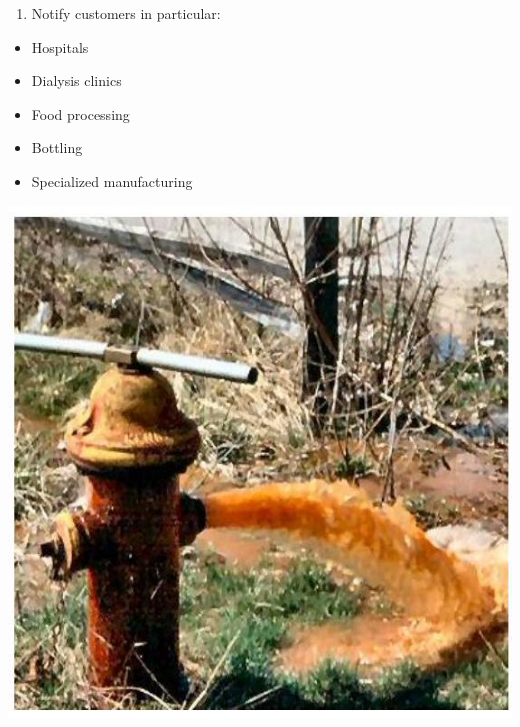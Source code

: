 \documentclass[10pt]{article}
\begin{document}
\begin{enumerate}
  \item Notify customers in particular:
\end{enumerate}
\begin{itemize}
  \item Hospitals

  \item Dialysis clinics

  \item Food processing

  \item Bottling

  \item Specialized manufacturing

\end{itemize}
\includegraphics[max width=\textwidth]{2022_10_30_098bb5f44c5986ff92a9g-76}
\end{document}
